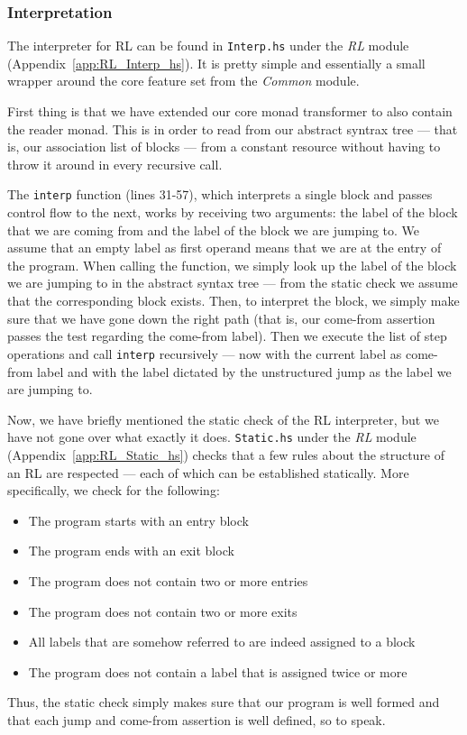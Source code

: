 \subsubsection{Interpretation}
The interpreter for RL can be found in \texttt{Interp.hs} under the \textit{RL} module (Appendix~\ref{app:RL_Interp_hs}). It is pretty simple and essentially a small wrapper around the core feature set from the \textit{Common} module.

First thing is that we have extended our core monad transformer to also contain the reader monad. This is in order to read from our abstract syntrax tree --- that is, our association list of blocks --- from a constant resource without having to throw it around in every recursive call.

The \texttt{interp} function (lines 31-57), which interprets a single block and passes control flow to the next, works by receiving two arguments: the label of the block that we are coming from and the label of the block we are jumping to. We assume that an empty label as first operand means that we are at the entry of the program. When calling the function, we simply look up the label of the block we are jumping to in the abstract syntax tree --- from the static check we assume that the corresponding block exists. Then, to interpret the block, we simply make sure that we have gone down the right path (that is, our come-from assertion passes the test regarding the come-from label). Then we execute the list of step operations and call \texttt{interp} recursively --- now with the current label as come-from label and with the label dictated by the unstructured jump as the label we are jumping to.

Now, we have briefly mentioned the static check of the RL interpreter, but we have not gone over what exactly it does. \texttt{Static.hs} under the \textit{RL} module (Appendix~\ref{app:RL_Static_hs}) checks that a few rules about the structure of an RL are respected --- each of which can be established statically. More specifically, we check for the following:
\begin{itemize}
  \item The program starts with an entry block
  \item The program ends with an exit block
  \item The program does not contain two or more entries
  \item The program does not contain two or more exits
  \item All labels that are somehow referred to are indeed assigned to a block
  \item The program does not contain a label that is assigned twice or more
\end{itemize}
Thus, the static check simply makes sure that our program is well formed and that each jump and come-from assertion is well defined, so to speak.

